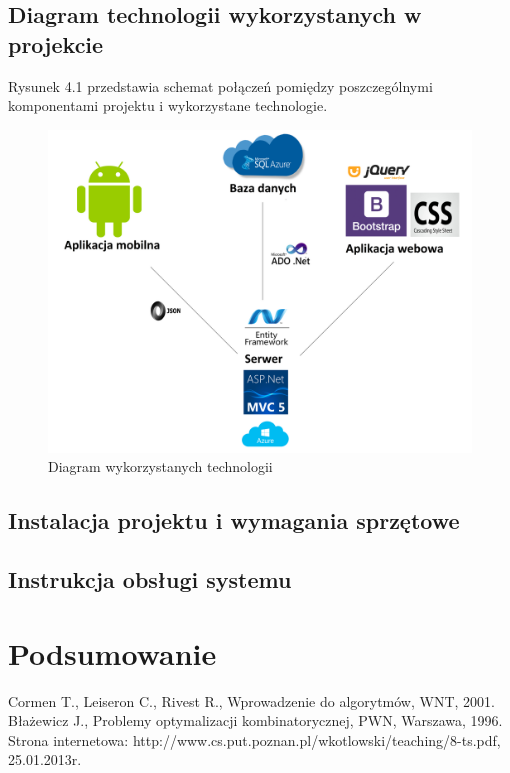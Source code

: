 \documentclass[a4paper,11pt]{article}
\begin{document}
\subsection{Diagram technologii wykorzystanych w projekcie}
Rysunek 4.1 przedstawia schemat połączeń pomiędzy poszczególnymi komponentami projektu i wykorzystane technologie.
\begin{figure}[H]
	\centering
	\includegraphics[width=\textwidth,height=0.6\textheight]{diagramTechnologii.png}
	\caption{Diagram wykorzystanych technologii}
\end{figure}
\subsection{Instalacja projektu i wymagania sprzętowe}
\subsection{Instrukcja obsługi systemu}
\section{Podsumowanie}

\newpage
\listoffigures
{} 
\newpage
\listoftables
{}
\newpage
\lstlistoflistings
{}


\newpage
{}
\begin{thebibliography}{9}
 Cormen T., Leiseron C., Rivest R., Wprowadzenie do algorytmów, WNT, 2001. 
 Błażewicz J., Problemy optymalizacji kombinatorycznej, PWN, Warszawa, 1996.
 Strona internetowa: http://www.cs.put.poznan.pl/wkotlowski/teaching/8-ts.pdf, 25.01.2013r.
\end{thebibliography}
\end{document}
